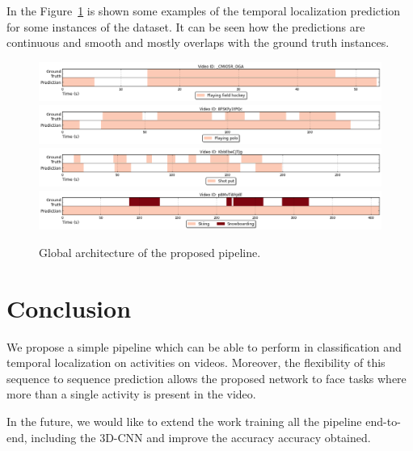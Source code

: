 \documentclass{article}
\begin{document}
In the Figure~\ref{fig:example_results} is shown some examples of the temporal localization prediction for some instances of the dataset. It can be seen how the predictions are continuous and smooth and mostly overlaps with the ground truth instances.

\begin{figure}[ht]
\centering
\includegraphics[width=1\linewidth]{img/activity_temporal_localization_8.png}
\includegraphics[width=1\linewidth]{img/activity_temporal_localization_11.png}
\includegraphics[width=1\linewidth]{img/activity_temporal_localization_20.png}
\includegraphics[width=1\linewidth]{img/activity_temporal_localization_35.png}

\caption{Global architecture of the proposed pipeline.}
\label{fig:example_results}
\end{figure}

\section{Conclusion}

We propose a simple pipeline which can be able to perform in classification and temporal localization on activities on videos. Moreover, the flexibility of this sequence to sequence prediction allows the proposed network to face tasks where more than a single activity is present in the video.


In the future, we would like to extend the work training all the pipeline end-to-end, including the 3D-CNN and improve the accuracy accuracy obtained.

\section*{}
{\small


}
\end{document}
